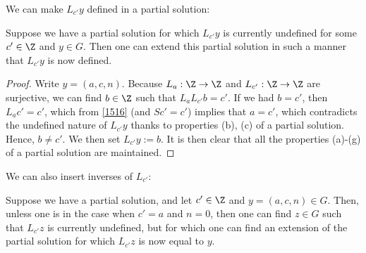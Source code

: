 We can make $L_{c'} y$ defined in a partial solution:

\begin{lemma}\label{first-ext}  Suppose we have a partial solution for which $L_{c'} y$ is currently undefined for some $c' \in \Z$ and $y \in G$.  Then one can extend this partial solution in such a manner that $L_{c'} y$ is now defined.
\end{lemma}

\begin{proof} Write $y = (a,c,n)$. Because $L_a: \Z \to \Z$ and $L_{c'}: \Z \to \Z$ are surjective, we can find $b \in \Z$ such that $L_a L_{c'} b = c'$.  If we had $b=c'$, then $L_a c' = c'$, which from \eqref{1516} (and $Sc' = c'$) implies that $a = c'$, which contradicts the undefined nature of $L_{c'} y$ thanks to properties (b), (c) of a partial solution.  Hence, $b \neq c'$.
  We then set $L_{c'} y := b$.  It is then clear that all the properties (a)-(g) of a partial solution are maintained.
\end{proof}

We can also insert inverses of $L_{c'}$:

\begin{lemma}\label{second-ext}  Suppose we have a partial solution, and let $c' \in \Z$ and $y = (a,c,n) \in G$.  Then, unless one is in the case when $c'=a$ and $n=0$, then one can find $z \in G$ such that $L_{c'} z$ is currently undefined, but for which one can find an extension of the partial solution for which $L_{c'} z$ is now equal to $y$.
\end{lemma}

